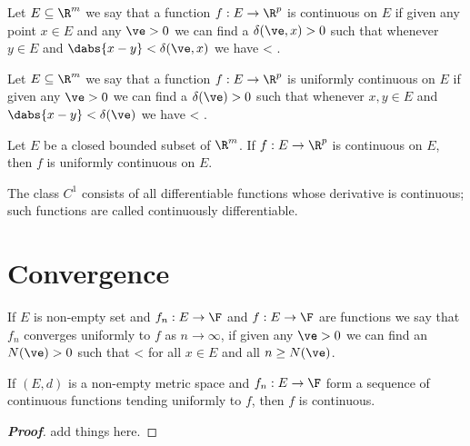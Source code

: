\begin{definition}\label{def:continous}
Let $E\subseteq \R^m$ we say that a function $f:E\to \R^p$ is continuous on $E$ if given any point $x \in E$ and any $\ve>0$ we can find a $\delta(\ve,x)>0$ such that whenever $y\in E$ and $\dabs{x-y} < \delta(\ve,x)$ we have
\be
{} < \ve.
\ee
\end{definition}

\begin{definition}\label{def:uniformly_continous}
Let $E\subseteq \R^m$ we say that a function $f:E\to \R^p$ is uniformly continuous on $E$ if given any $\ve>0$ we can find a $\delta(\ve)>0$ such that whenever $x,y\in E$ and $\dabs{x-y} < \delta(\ve)$ we have
\be
{} < \ve.
\ee
\end{definition}

\begin{theorem} \label{thm:_uniformly_continuous}
Let $E$ be a closed bounded subset of $\R^m$. If $f: E\to \R^p$ is continuous on $E$, then $f$ is uniformly continuous on $E$.
\end{theorem}

\begin{definition}\label{def:continously_differentiable}
The class $C^1$ consists of all differentiable functions whose derivative is continuous; such functions are called continuously differentiable. 
\end{definition}

\section{Convergence}

\begin{definition}\label{def:uniform_convergence}
If $E$ is non-empty set and $f_n:E\to \F$ and $f:E\to\F$ are functions we say that $f_n$ converges uniformly to $f$ as $n\to \infty$, if given any $\ve>0$ we can find an $N(\ve)>0$ such that
\be
{} < \ve
\ee
for all $x\in E$ and all $n\geq N(\ve)$.
\end{definition}

\begin{theorem}\label{thm:function_uniform_convergence_continuous}
If $(E,d)$ is a non-empty metric space and $f_n: E\to \F$ form a sequence of continuous functions tending uniformly to $f$, then $f$ is continuous.
\end{theorem}


\begin{proof}[{\bf Proof}]
add things here.
\end{proof}

